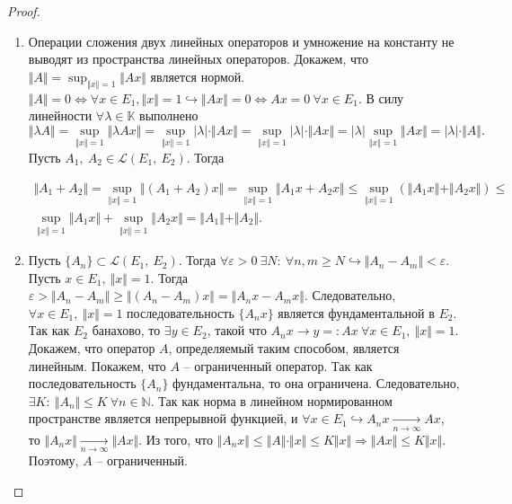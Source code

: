 \begin{proof} ~
\begin{enumerate}
    \item Операции сложения двух линейных операторов и умножение на константу не выводят из пространства линейных операторов. Докажем, что $\displaystyle \Vert A\Vert =\sup _{\Vert x\Vert =1}\Vert Ax\Vert $ является нормой. $\displaystyle \Vert A\Vert =0\Leftrightarrow \forall x\in E_{1} ,\Vert x\Vert =1\hookrightarrow \Vert Ax\Vert =0\Leftrightarrow Ax=0\ \forall x\in E_{1}$. В силу линейности $\displaystyle \forall \lambda \in \mathbb{K}$ выполнено
    \begin{equation*}
    \Vert \lambda A\Vert =\sup _{\Vert x\Vert =1}\Vert \lambda Ax\Vert =\sup _{\Vert x\Vert =1}| \lambda | \cdotp \Vert Ax\Vert =\sup _{\Vert x\Vert =1}| \lambda | \cdotp \Vert Ax\Vert =| \lambda | \sup _{\Vert x\Vert =1}\Vert Ax\Vert =| \lambda | \cdotp \Vert A\Vert .
    \end{equation*}
    Пусть $\displaystyle A_{1} ,\ A_{2} \in \mathcal{L}( E_{1} ,\ E_{2})$. Тогда
    
    
    \begin{gather*}
    \Vert A_{1} +A_{2}\Vert =\sup _{\Vert x\Vert =1}\Vert ( A_{1} +A_{2}) x\Vert =\sup _{\Vert x\Vert =1}\Vert A_{1} x+A_{2} x\Vert \leqslant \sup _{\Vert x\Vert =1}(\Vert A_{1} x\Vert +\Vert A_{2} x\Vert ) \leqslant \\
    \sup _{\Vert x\Vert =1}\Vert A_{1} x\Vert +\sup _{\Vert x\Vert =1}\Vert A_{2} x\Vert =\Vert A_{1}\Vert +\Vert A_{2}\Vert .
    \end{gather*}
    \item Пусть $\displaystyle \{A_{n}\} \subset \mathcal{L}( E_{1} ,\ E_{2})$. Тогда $\displaystyle \forall \varepsilon  >0\ \exists N:\ \forall n,m\geqslant N\hookrightarrow \Vert A_{n} -A_{m}\Vert < \varepsilon $. Пусть $\displaystyle x\in E_{1} ,\ \Vert x\Vert =1$. Тогда $\displaystyle \varepsilon  >\Vert A_{n} -A_{m}\Vert \geqslant \Vert ( A_{n} -A_{m}) x\Vert =\Vert A_{n} x-A_{m} x\Vert $. Следовательно, $\displaystyle \forall x\in E_{1} ,\ \Vert x\Vert =1$ последовательность $\displaystyle \{A_{n} x\}$ является фундаментальной в $\displaystyle E_{2}$. Так как $\displaystyle E_{2}$ банахово, то $\displaystyle \exists y\in E_{2}$, такой что $\displaystyle A_{n} x\rightarrow y=:Ax\ \forall x\in E_{1} ,\ \Vert x\Vert =1$. Докажем, что оператор $\displaystyle A$, определяемый таким способом, является линейным. Покажем, что $\displaystyle A$ -- ограниченный оператор. Так как последовательность $\displaystyle \{A_{n}\}$ фундаментальна, то она ограничена. Следовательно, $\displaystyle \exists K:\ \Vert A_{n}\Vert \leqslant K\ \forall n\in \mathbb{N}$. Так как норма в линейном нормированном пространстве является непрерывной функцией, и $\displaystyle \forall x\in E_{1} \hookrightarrow A_{n} x\xrightarrow[n\rightarrow \infty ]{} Ax$, то $\displaystyle \Vert A_{n} x\Vert \xrightarrow[n\rightarrow \infty ]{}\Vert Ax\Vert $. Из того, что $\displaystyle \Vert A_{n} x\Vert \leqslant \Vert A\Vert \cdotp \Vert x\Vert \leqslant K\Vert x\Vert \Rightarrow \Vert Ax\Vert \leqslant K\Vert x\Vert $. Поэтому, $\displaystyle A$ -- ограниченный.


\end{enumerate}
\end{proof}
